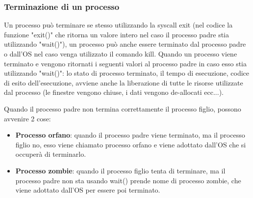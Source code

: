 \documentclass{article}
\begin{document}
        \subsubsection{Terminazione di un processo}
            
            Un processo può terminare se stesso utilizzando la syscall exit (nel codice la funzione "exit()" che ritorna un valore intero nel caso il processo padre stia utilizzando "wait()"), un processo può anche essere terminato dal processo padre o dall'OS nel caso venga utilizzato il comando kill.
            Quando un processo viene terminato e vengono ritornati i seguenti valori al processo padre in caso esso stia utilizzando "wait()": lo stato di processo terminato, il tempo di esecuzione, codice di esito dell'esecuzione, avviene anche la liberazione di tutte le risorse utilizzate dal processo (le finestre vengono chiuse, i dati vengono de-allocati ecc...).

            \begin{tcolorbox}[colback= green!10!white, colframe=green!40!black, title=processo orfano e processo zombie]
                Quando il processo padre non termina correttamente il processo figlio, possono avvenire 2 cose:

                \begin{itemize}
                    
                    \item \textbf{Processo orfano}:
                        quando il processo padre viene terminato, ma il processo figlio no, esso viene chiamato processo orfano e viene adottato dall'OS che si occuperà di terminarlo.
                    
                    \item \textbf{Processo zombie}:
                        quando il processo figlio tenta di terminare, ma il processo padre non sta usando wait() prende nome di processo zombie, che viene adottato dall'OS per essere poi terminato.
                \end{itemize}

            \end{tcolorbox}
    
\end{document}
